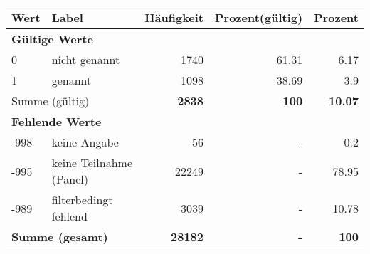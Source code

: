      \begin{longtable}{lXrrr}
     \toprule
     \textbf{Wert} & \textbf{Label} & \textbf{Häufigkeit} & \textbf{Prozent(gültig)} & \textbf{Prozent} \\
     \endhead
     \midrule
     \multicolumn{5}{l}{\textbf{Gültige Werte}}\\

     0 &
     \multicolumn{1}{X}{ nicht genannt   } &


       \num{1740} &
       \num[round-mode=places,round-precision=2]{61.31} &
         \num[round-mode=places,round-precision=2]{6.17} \\

     1 &
     \multicolumn{1}{X}{ genannt   } &


       \num{1098} &
       \num[round-mode=places,round-precision=2]{38.69} &
         \num[round-mode=places,round-precision=2]{3.9} \\
     \midrule
     \multicolumn{2}{l}{Summe (gültig)} &
       \textbf{\num{2838}} &
     \textbf{100} &
       \textbf{\num[round-mode=places,round-precision=2]{10.07}} \\
     \multicolumn{5}{l}{\textbf{Fehlende Werte}}\\
       -998 &
       keine Angabe &
         \num{56} &
        - &
         \num[round-mode=places,round-precision=2]{0.2} \\
       -995 &
       keine Teilnahme (Panel) &
         \num{22249} &
        - &
         \num[round-mode=places,round-precision=2]{78.95} \\
       -989 &
       filterbedingt fehlend &
         \num{3039} &
        - &
         \num[round-mode=places,round-precision=2]{10.78} \\
     \midrule
     \multicolumn{2}{l}{\textbf{Summe (gesamt)}} &
          \textbf{\num{28182}} &
        \textbf{-} &
        \textbf{100} \\
     \bottomrule
     \end{longtable}
     
